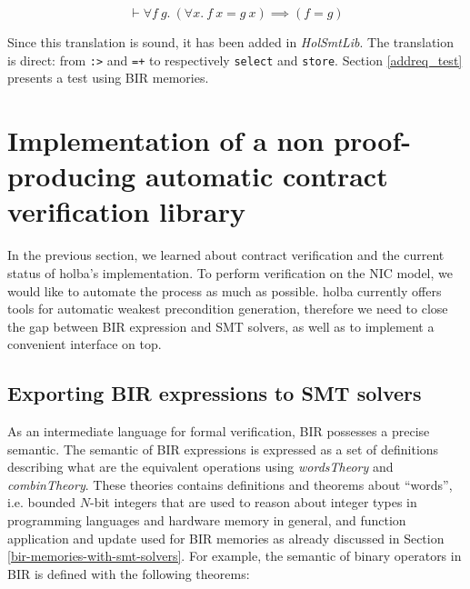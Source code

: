 \documentclass{kththesis}
\begin{document}
\begin{equation}
    \vdash \forall f~g.~(\forall x.~f~x = g~x) \implies (f = g)
    \label{bool_EQ_EXT}
\end{equation}

Since this translation is sound, it has been added in \textit{HolSmtLib}. The translation is direct: from \texttt{:>} and \texttt{=+} to respectively \texttt{select} and \texttt{store}. Section \ref{addreq_test} presents a test using BIR memories.


\section{Implementation of a non proof-producing automatic contract verification library} \label{impl-non-pp-wp-lib}

In the previous section, we learned about contract verification and the current status of \gls{holba}'s implementation. To perform verification on the \gls{NIC} model, we would like to automate the process as much as possible. \gls{holba} currently offers tools for automatic weakest precondition generation, therefore we need to close the gap between BIR expression and SMT solvers, as well as to implement a convenient interface on top.

\subsection{Exporting BIR expressions to SMT solvers} \label{exporting-bir-to-smt}

As an intermediate language for formal verification, \gls{BIR} possesses a precise semantic. The semantic of BIR expressions is expressed as a set of definitions  describing what are the equivalent operations using \textit{wordsTheory} and \textit{combinTheory}. These theories contains definitions and theorems about ``words'', i.e. bounded $N$-bit integers that are used to reason about integer types in programming languages and hardware memory in general, and function application and update used for BIR memories as already discussed in Section \ref{bir-memories-with-smt-solvers}. For example, the semantic of binary operators in BIR is defined with the following theorems\footnotemark:

\end{document}
